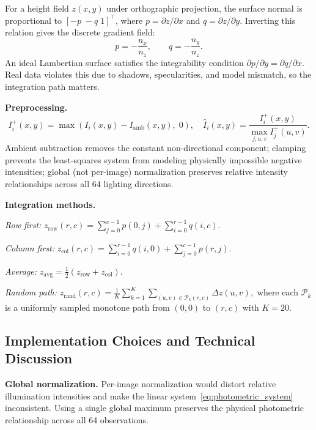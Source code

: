 {For a height field $z(x,y)$ under orthographic projection, the surface normal is
proportional to $[-p\;-q\;1]^\top$, where $p = \partial z/\partial x$ and
$q = \partial z/\partial y$.  Inverting this relation gives the discrete gradient
field:
\begin{equation}
  p = -\frac{n_x}{n_z}, \qquad q = -\frac{n_y}{n_z}.
  \label{eq:gradient_field}
\end{equation}
An ideal Lambertian surface satisfies the integrability condition
$\partial p/\partial y = \partial q/\partial x$.  Real data violates this due to
shadows, specularities, and model mismatch, so the integration path matters.

\textbf{Preprocessing.}
\begin{equation}
  I_i^+(x,y) = \max\!\left(I_i(x,y) - I_{\mathrm{amb}}(x,y),\;0\right),
  \quad
  \hat{I}_i(x,y) = \frac{I_i^+(x,y)}{\max_{j,u,v} I_j^+(u,v)}.
  \label{eq:preprocess}
\end{equation}
Ambient subtraction removes the constant non-directional component; clamping
prevents the least-squares system from modeling physically impossible negative
intensities; global (not per-image) normalization preserves relative intensity
relationships across all 64 lighting directions.

\textbf{Integration methods.}

\emph{Row first:}
$\displaystyle z_{\mathrm{row}}(r,c)
  = \sum_{j=0}^{c-1} p(0,j) + \sum_{i=0}^{r-1} q(i,c).$

\emph{Column first:}
$\displaystyle z_{\mathrm{col}}(r,c)
  = \sum_{i=0}^{r-1} q(i,0) + \sum_{j=0}^{c-1} p(r,j).$

\emph{Average:} $z_{\mathrm{avg}} = \tfrac{1}{2}(z_{\mathrm{row}} + z_{\mathrm{col}})$.

\emph{Random path:}
$\displaystyle z_{\mathrm{rand}}(r,c)
  = \frac{1}{K}\sum_{k=1}^{K}\sum_{(u,v)\in\mathcal{P}_k(r,c)} \Delta z(u,v),$
where each $\mathcal{P}_k$ is a uniformly sampled monotone path from $(0,0)$
to $(r,c)$ with $K = 20$.

\subsection*{Implementation Choices and Technical Discussion}

\textbf{Global normalization.}  Per-image normalization would distort relative
illumination intensities and make the linear system~\eqref{eq:photometric_system}
inconsistent.  Using a single global maximum preserves the physical photometric
relationship across all 64 observations.

}
